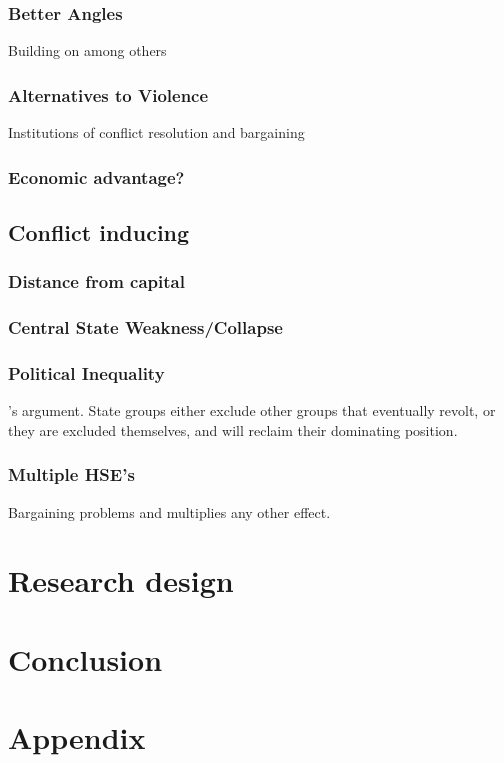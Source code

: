 \documentclass[12pt]{article}
\begin{document}
\subsubsection{Better Angles}

Building on among others \citet{Tilly1990} 

\subsubsection{Alternatives to Violence}

Institutions of conflict resolution and bargaining

\subsubsection{Economic advantage?}

\subsection{Conflict inducing}

\subsubsection{Distance from capital}

\subsubsection{Central State Weakness/Collapse}

\subsubsection{Political Inequality}

\citet{Paine2019}'s argument. State groups either exclude other groups that
eventually revolt, or they are excluded themselves, and will reclaim their
dominating position.

\subsubsection{Multiple HSE's}

Bargaining problems and multiplies any other effect.

\section{Research design}

\section{Conclusion}

\pagebreak




\section{Appendix}
\end{document}
